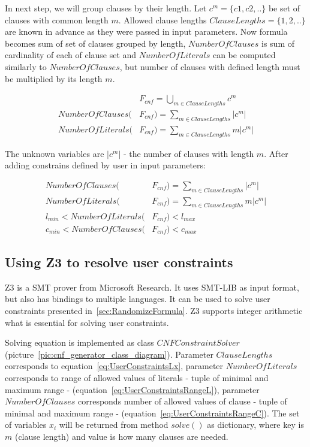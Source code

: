 In next step, we will group clauses by their length. Let $c^m = \{c1,c2,..\}$ be set of clauses with common length $m$. Allowed clause lengths $ClauseLengths=\{1,2,..\}$ are known in advance as they were passed in input parameters. Now formula becomes sum of set of clauses grouped by length, $NumberOfClauses$ is sum of cardinality of each of clause set and $NumberOfLiterals$ can be computed similarly to $NumberOfClauses$, but number of clauses with defined length must be multiplied by its length $m$.

\begin{align*}
  &F_{cnf} = \bigcup_{m \in ClauseLengths} c^m \\
  NumberOfClauses(&F_{cnf}) = \sum_{m \in ClauseLengths} |c^m| \\
  NumberOfLiterals(&F_{cnf}) = \sum_{m \in ClauseLengths} m |c^m| 
\end{align*}

The unknown variables are $|c^m|$ - the number of clauses with length $m$. After adding constrains defined by user in input parameters:

\begin{align}
  NumberOfClauses(&F_{cnf}) = \sum_{m \in ClauseLengths} |c^m| \label{eq:UserConstraintsX}\\
  NumberOfLiterals(&F_{cnf}) = \sum_{m \in ClauseLengths} m |c^m| \label{eq:UserConstraintsLx} \\
  l_{min} < NumberOfLiterals(&F_{cnf})< l_{max} \label{eq:UserConstraintsRangeL}\\
  c_{min} < NumberOfClauses(&F_{cnf}) < c_{max}\label{eq:UserConstraintsRangeC} 
\end{align}

\subsection{Using Z3 to resolve user constraints}

Z3 \cite{Z3Solver} is a \gls{SMT} prover from Microsoft Research. It uses SMT-LIB as input format, but also has bindings to multiple languages. It can be used to solve user constraints presented in~\ref{sec:RandomizeFormula}. Z3 supports integer arithmetic what is essential for solving user constraints.

Solving equation is implemented as class $CNFConstraintSolver$ (picture~\ref{pic:cnf_generator_class_diagram}). Parameter $ClauseLengths$ corresponds to equation~\ref{eq:UserConstraintsLx}, parameter $NumberOfLiterals$ corresponds to range of allowed values of literals - tuple of minimal and maximum range - (equation~\ref{eq:UserConstraintsRangeL}), parameter $NumberOfClauses$ corresponds number of allowed values of clause - tuple of minimal and maximum range - (equation~\ref{eq:UserConstraintsRangeC}). The set of variables $x_i$ will be returned from method $solve()$ as dictionary, where key is $m$ (clause length) and value is how many clauses are needed.


